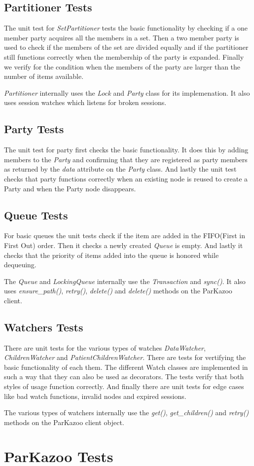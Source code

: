 \subsection{Partitioner Tests}
The unit test for \textit{SetPartitioner} tests the basic functionality by checking if a one member party acquires all the members in a set. Then a two member party is used to check if the members of the set are divided equally and if the partitioner still functions correctly when the membership of the party is expanded. Finally we verify for the condition when the members of the party are larger than the number of items available. 

\textit{Partitioner} internally uses the \textit{Lock} and \textit{Party} class for its implemenation. It also uses session watches which listens for broken sessions. 

\subsection{Party Tests}
The unit test for party first checks the basic functionality. It does this by adding members to the \textit{Party} and confirming that they are registered as party members as returned by the \textit{data} attribute on the \textit{Party} class. And lastly the unit test checks that party functions correctly when an existing node is reused to create a Party and when the Party node disappears.

\subsection{Queue Tests}
For basic queues the unit tests check if the item are added in the FIFO(First in First Out) order. Then it checks a newly created \textit{Queue} is empty. And lastly it checks that the priority of items added into the queue is honored while dequeuing.

The \textit{Queue} and \textit{LockingQueue} internally use the \textit{Transaction} and \textit{sync()}. It also uses \textit{ensure\_path()}, \textit{retry()}, \textit{delete()} and \textit{delete()} methods on the ParKazoo client.

\subsection{Watchers Tests}
There are unit tests for the various types of watches \textit{DataWatcher}, \textit{ChildrenWatcher} and \textit{PatientChildrenWatcher}. There are tests for vertifying the basic functionality of each them. The different Watch classes are implemented in such a way that they can also be used as decorators. The tests verify that both styles of usage function correctly. And finally there are unit tests for edge cases like bad watch functions, invalid nodes and expired sessions.

The various types of watchers internally use the \textit{get()}, \textit{get\_children()} and \textit{retry()} methods on the ParKazoo client object.

\section{ParKazoo Tests}

